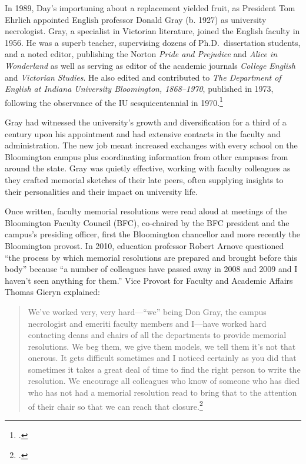 \documentclass[
  american,
  letterpaper,
]{scrreprt}
\begin{document}
In 1989, Day's importuning about a replacement yielded fruit, as
President Tom Ehrlich appointed English professor Donald Gray (b. 1927)
as university necrologist. Gray, a specialist in Victorian literature,
joined the English faculty in 1956. He was a superb teacher, supervising
dozens of Ph.D.~dissertation students, and a noted editor, publishing
the Norton \emph{Pride and Prejudice} and \emph{Alice in Wonderland} as
well as serving as editor of the academic journals \emph{College
English} and \emph{Victorian Studies}. He also edited and contributed to
\emph{The Department of English at Indiana University Bloomington,
1868--1970}, published in 1973, following the observance of the IU
sesquicentennial in 1970.\footnote{.}

Gray had witnessed the university's growth and diversification for a
third of a century upon his appointment and had extensive contacts in
the faculty and administration. The new job meant increased exchanges
with every school on the Bloomington campus plus coordinating
information from other campuses from around the state. Gray was quietly
effective, working with faculty colleagues as they crafted memorial
sketches of their late peers, often supplying insights to their
personalities and their impact on university life.

Once written, faculty memorial resolutions were read aloud at meetings
of the Bloomington Faculty Council (BFC), co-chaired by the BFC
president and the campus's presiding officer, first the Bloomington
chancellor and more recently the Bloomington provost. In 2010, education
professor Robert Arnove questioned ``the process by which memorial
resolutions are prepared and brought before this body'' because ``a
number of colleagues have passed away in 2008 and 2009 and I haven't
seen anything for them.'' Vice Provost for Faculty and Academic Affairs
Thomas Gieryn explained:

\begin{quote}
We've worked very, very hard---``we'' being Don Gray, the campus
necrologist and emeriti faculty members and I---have worked hard
contacting deans and chairs of all the departments to provide memorial
resolutions. We beg them, we give them models, we tell them it's not
that onerous. It gets difficult sometimes and I noticed certainly as you
did that sometimes it takes a great deal of time to find the right
person to write the resolution. We encourage all colleagues who know of
someone who has died who has not had a memorial resolution read to bring
that to the attention of their chair so that we can reach that
closure.\footnote{.}
\end{quote}
\end{document}
